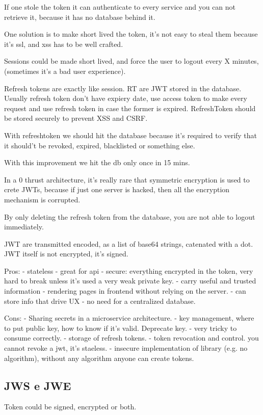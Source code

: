 \documentclass{style}
\begin{document}
If one stole the token it can authenticate to every service and you can not
retrieve it, because it has no database behind it.

One solution is to make short lived the token, it's not easy to steal them
because it's ssl, and xss has to be well crafted.

Sessions could be made short lived, and force the user to logout every X
minutes, (sometimes it's a bad user experience).

Refresh tokens are exactly like session.
RT are JWT stored in the database. Usually refresh token don't have expiery
date, use access token to make every request and use refresh token in case the
former is expired.
RefreshToken should be stored securely to prevent XSS and CSRF.

With refreshtoken we should hit the database because it's required to verify
that it should't be revoked, expired, blacklisted or something else.

With this improvement we hit the db only once in 15 mins.

In a 0 thrust architecture, it's really rare that symmetric encryption is used
to crete JWTs, because if just one server is hacked, then all the encryption
mechanism is corrupted.

By only deleting the refresh token from the database, you are not able to
logout immediately.

JWT are transmitted encoded, as a list of base64 strings, catenated with a dot.
JWT itself is not encrypted, it's signed.

Pros:
- stateless
- great for api
- secure: everything encrypted in the token, very hard to break unless it's
used a very weak private key.
- carry useful and trusted information
- rendering pages in frontend without relying on the server.
- can store info that drive UX
- no need for a centralized database.

Cons:
- Sharing secrets in a microservice architecture.
- key management, where to put public key, how to know if it's valid. Deprecate key.
- very tricky to consume correctly.
- storage of refresh tokens.
- token revocation and control. you cannot revoke a jwt, it's staeless.
- insecure implementation of library (e.g. no algorithm), without any algorithm
anyone can create tokens.


\subsection{JWS e JWE}
Token could be signed, encrypted or both.
\end{document}
